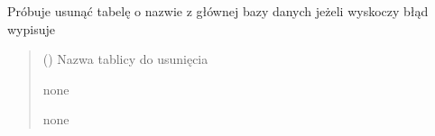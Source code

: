 \documentclass[letterpaper,10pt,polish]{sphinxmanual}
\begin{document}
\begin{fulllineitems}

\pysigstartsignatures
{}
\pysigstopsignatures
\sphinxAtStartPar
Próbuje usunąć tabelę o nazwie  z głównej bazy danych jeżeli wyskoczy błąd wypisuje 
\begin{quote}\begin{description}
\sphinxAtStartPar
{} () \textendash{} Nazwa tablicy do usunięcia

\sphinxAtStartPar
none

\sphinxAtStartPar
none

\end{description}\end{quote}

\end{fulllineitems}
\end{document}
